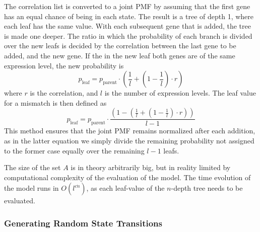 \documentclass[../main.tex]{subfiles}
\begin{document}
The correlation list is converted to a joint PMF by assuming that the first gene has an equal chance of being in each state. %
The result is a tree of depth 1, where each leaf has the same value.
With each subsequent gene that is added, the tree is made one deeper.
The ratio in which the probability of each branch is divided over the new leafs is decided by the correlation between the last gene to be added, and the new gene.
If the in the new leaf both genes are of the same expression level, the new probability is
%
\begin{equation}
    p_\mathrm{leaf} = p_\mathrm{parent} \cdot (\frac{1}{l} + (1 - \frac{1}{l}) \cdot r)
\end{equation}
%
where $r$ is the correlation, and $l$ is the number of expression levels.
The leaf value for a mismatch is then defined as
%
\begin{equation}
    p_\mathrm{leaf} = p_\mathrm{parent} \cdot \frac{(1 - (\frac{1}{l} + (1 - \frac{1}{l}) \cdot r))}{l-1} 
\end{equation}
%
This method ensures that the joint PMF remains normalized after each addition, as in the latter equation we simply divide the remaining probability not assigned to the former case equally over the remaining $l-1$ leafs.

The size of the set $A$ is in theory arbitrarily big, but in reality limited by computational complexity of the evaluation of the model. %
The time evolution of the model runs in $O(l^{c \dot n})$, as each leaf-value of the $n$-depth tree needs to be evaluated.  %

\subsubsection{Generating Random State Transitions}
\end{document}
